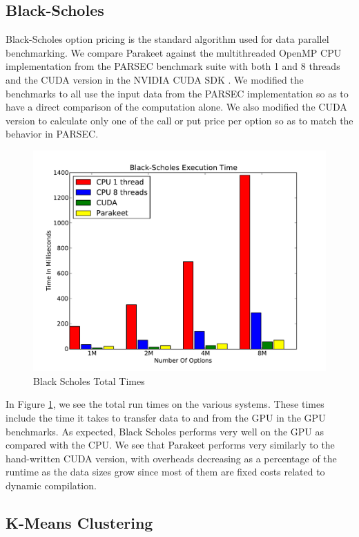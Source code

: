 \documentclass[10pt,twocolumn]{article}
\begin{document}
\subsection{Black-Scholes}
\label{results-bs}

Black-Scholes option pricing \cite{Blac73} is the standard algorithm used for data parallel benchmarking.  We compare Parakeet against the multithreaded OpenMP CPU implementation from the PARSEC \cite{Bien08} benchmark suite with both 1 and 8 threads and the CUDA version in the NVIDIA CUDA SDK \cite{NvidSD}.  We modified the benchmarks to all use the input data from the PARSEC implementation so as to have a direct comparison of the computation alone.  We also modified the CUDA version to calculate only one of the call or put price per option so as to match the behavior in PARSEC.

\begin{figure}[h!]
\includegraphics[scale=0.4]{BSWCPU.pdf}
\caption{Black Scholes Total Times}
\label{BSCPU}
\end{figure}

In Figure \ref{BSCPU}, we see the total run times on the various systems. These times include the time it takes to transfer data to and from the GPU in the GPU benchmarks.  As expected, Black Scholes performs very well on the GPU as compared with the CPU.  We see that Parakeet performs very similarly to the hand-written CUDA version, with overheads decreasing as a percentage of the runtime as the data sizes grow since most of them are fixed costs related to dynamic compilation.

\subsection{K-Means Clustering}
\label{results-k-means}
\end{document}
